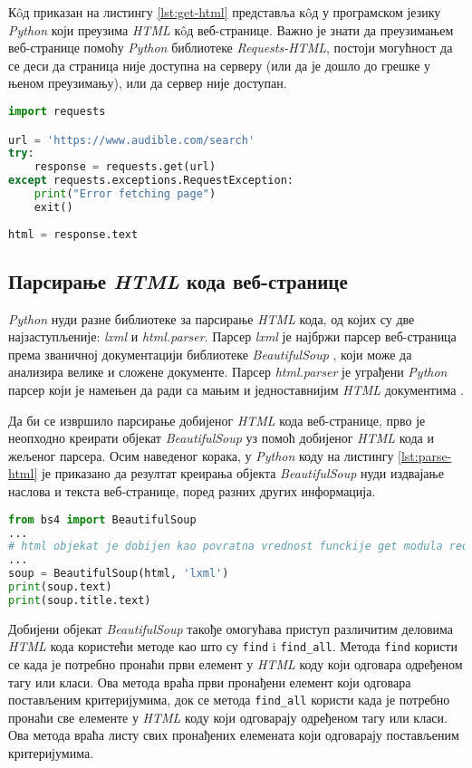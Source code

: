 \documentclass[12pt,oneside]{memoir}
\begin{document}
Кôд приказан на листингу \ref{lst:get-html} представља кôд у програмском језику \textit{Python} који преузима \textit{HTML} кôд веб-странице. Важно је знати да преузимањем веб-странице помоћу \textit{Python} библиотеке \textit{Requests-HTML}, постоји могућност да се деси да страница није доступна на серверу (или да је дошло до грешке у њеном преузимању), или да сервер није доступан.
\begin{lstlisting}[language=Python, caption={Прикупљање \textit{HTML} кода веб-странице}, label={lst:get-html}]
import requests

url = 'https://www.audible.com/search'
try: 
    response = requests.get(url) 
except requests.exceptions.RequestException:
    print("Error fetching page")
    exit()    
    
html = response.text
\end{lstlisting}

\subsection{Парсирање \textit{HTML} кода веб-странице}
\textit{Python} нуди разне библиотеке за парсирање \textit{HTML} кода, од којих су две најзаступљеније: \textit{lxml} и \textit{html.parser}. Парсер \textit{lxml} је најбржи парсер веб-страница према званичној документацији библиотеке \textit{BeautifulSoup} \cite{beautifulSoapDocs}, који може да анализира велике и сложене документе. Парсер \textit{html.parser} је уграђени \textit{Python} парсер који је намењен да ради са мањим и једноставнијим \textit{HTML} документима \cite{WebScrapingWithPython}.

Да би се извршило парсирање добијеног \textit{HTML} кода веб-странице, прво је неопходно креирати објекат \textit{BeautifulSoup} уз помоћ добијеног \textit{HTML} кода и жељеног парсера. Осим наведеног корака, у \textit{Python} коду на листингу \ref{lst:parse-html} је приказано да резултат креирања објекта \textit{BeautifulSoup} нуди издвајање наслова и текста веб-странице, поред разних других информација.

\begin{lstlisting}[language=Python, caption={Креирање објекта \textit{BeautifulSoup}}, label={lst:parse-html}]
from bs4 import BeautifulSoup
...
# html objekat je dobijen kao povratna vrednost funckije get modula requests
...
soup = BeautifulSoup(html, 'lxml')
print(soup.text)
print(soup.title.text)
\end{lstlisting}

Добијени објекат \textit{BeautifulSoup} такође омогућава приступ различитим деловима \textit{HTML} кода користећи методе као што су \texttt{find} i \texttt{find\_all}. Метода \texttt{find} користи се када је потребно пронаћи први елемент у \textit{HTML} коду који одговара одређеном тагу или класи. Ова метода враћа први пронађени елемент који одговара постављеним критеријумима, док се метода \texttt{find\_all} користи када је потребно пронаћи све елементе у \textit{HTML} коду који одговарају одређеном тагу или класи. Ова метода враћа листу свих пронађених елемената који одговарају постављеним критеријумима.
\end{document}
